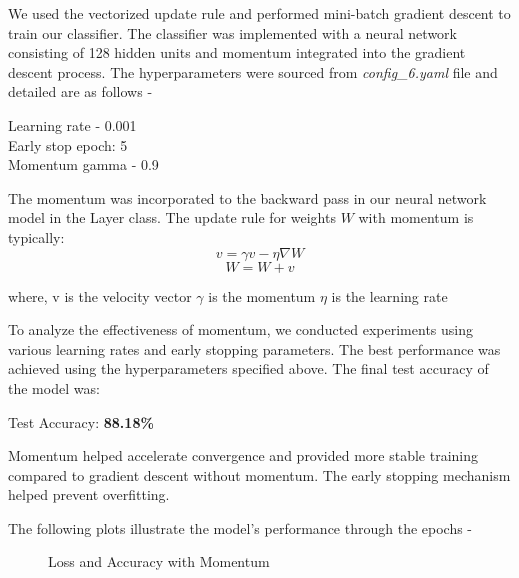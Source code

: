 \documentclass{article}
\begin{document}
We used the vectorized update rule and performed mini-batch gradient descent to train our classifier. The classifier was implemented with a neural network consisting of 128 hidden units and momentum integrated into the gradient descent process.
The hyperparameters were sourced from \textit{config\_6.yaml} file and detailed are as follows -

Learning rate - 0.001\\
Early stop epoch: 5\\
Momentum gamma - 0.9

The momentum was incorporated to the backward pass in our neural network model in the Layer class. The update rule for weights \( W \) with momentum is typically:
\[
v = \gamma v - \eta \nabla W
\]
\[
W = W + v
\]

where,
v is the velocity vector
$\gamma$ is the momentum
$\eta$ is the learning rate


To analyze the effectiveness of momentum, we conducted experiments using various learning rates and early stopping parameters. The best performance was achieved using the hyperparameters specified above. The final test accuracy of the model was:

Test Accuracy: \textbf{88.18\%}

Momentum helped accelerate convergence and provided more stable training compared to gradient descent without momentum. The early stopping mechanism helped prevent overfitting.

The following plots illustrate the model’s performance through the epochs - 
\begin{figure}[h!]
    \centering
    \hfill
    \caption{Loss and Accuracy with Momentum}
    \label{fig:loss_acc_l2}
\end{figure}
\end{document}
